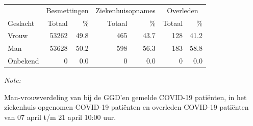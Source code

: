 \documentclass[
  english,
  man,floatsintext]{apa6}
\begin{document}
\begin{table}
\centering\begingroup\fontsize{11}{13}\selectfont

\begin{threeparttable}
\begin{tabular}{lrrrrrr}
\toprule
\multicolumn{1}{c}{ } & \multicolumn{2}{c}{Besmettingen} & \multicolumn{2}{c}{Ziekenhuisopnames} & \multicolumn{2}{c}{Overleden} \\
\cmidrule(l{3pt}r{3pt}){2-3} \cmidrule(l{3pt}r{3pt}){4-5} \cmidrule(l{3pt}r{3pt}){6-7}
Geslacht & Totaal & \% & Totaal & \% & Totaal & \%\\
\midrule
Vrouw & 53262 & 49.8 & 465 & 43.7 & 128 & 41.2\\
Man & 53628 & 50.2 & 598 & 56.3 & 183 & 58.8\\
Onbekend & 0 & 0.0 & 0 & 0.0 & 0 & 0.0\\
\bottomrule
\end{tabular}
\begin{tablenotes}
\item \textit{Note: } 
\item Man-vrouwverdeling van bij de GGD’en gemelde COVID-19 patiënten, in het ziekenhuis opgenomen COVID-19 patiënten en overleden COVID-19 patiënten van 07 april t/m 21 april 10:00 uur.
\end{tablenotes}
\end{threeparttable}
\endgroup{}
\end{table}
\newpage
\end{document}
